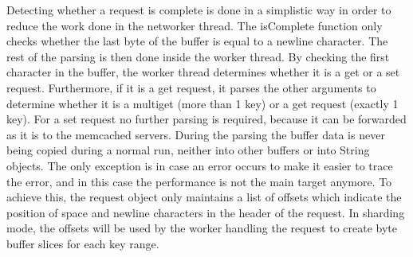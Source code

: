 \documentclass[11pt,a4paper]{article}
\begin{document}
Detecting whether a request is complete is done in a simplistic way in order to reduce the work done in the networker thread.
The isComplete function only checks whether the last byte of the buffer is equal to a newline character.
The rest of the parsing is then done inside the worker thread. By checking the first character in the buffer, the worker thread determines whether it is a get or a set request.
Furthermore, if it is a get request, it parses the other arguments to determine whether it is a multiget (more than 1 key) or a get request (exactly 1 key).
For a set request no further parsing is required, because it can be forwarded as it is to the memcached servers.
During the parsing the buffer data is never being copied during a normal run, neither into other buffers or into String objects.
The only exception is in case an error occurs to make it easier to trace the error, and in this case the performance is not the main target anymore.
To achieve this, the request object only maintains a list of offsets which indicate the position of space and newline characters in the header of the request.
In sharding mode, the offsets will be used by the worker handling the request to create byte buffer slices for each key range.
\end{document}
